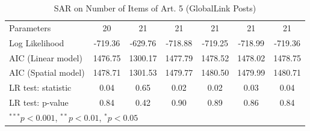 \begin{table}[!h]
\begin{center}
\begin{tabular}{l c c c c c c }
Parameters              & 20           & 21           & 21           & 21           & 21           & 21           \\
Log Likelihood          & -719.36      & -629.76      & -718.88      & -719.25      & -718.99      & -719.36      \\
AIC (Linear model)      & 1476.75      & 1300.17      & 1477.79      & 1478.52      & 1478.02      & 1478.75      \\
AIC (Spatial model)     & 1478.71      & 1301.53      & 1479.77      & 1480.50      & 1479.99      & 1480.71      \\
LR test: statistic      & 0.04         & 0.65         & 0.02         & 0.02         & 0.03         & 0.04         \\
LR test: p-value        & 0.84         & 0.42         & 0.90         & 0.89         & 0.86         & 0.84         \\
\bottomrule
\multicolumn{7}{l}{\scriptsize{$^{***}p<0.001$, $^{**}p<0.01$, $^*p<0.05$}}
\end{tabular}
\caption{SAR on Number of Items of Art. 5 (GlobalLink Posts)}
\label{table:coefficients}
\end{center}
\end{table}

